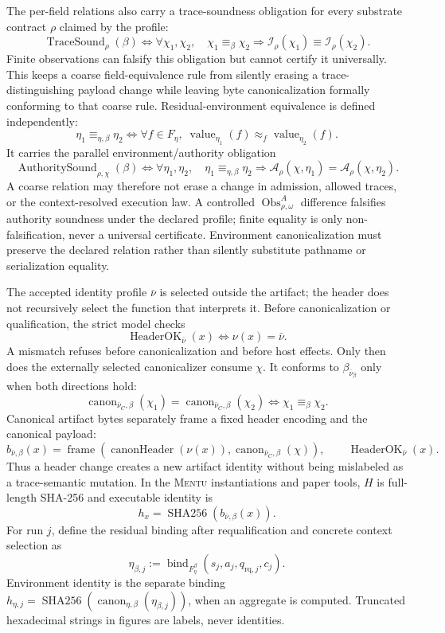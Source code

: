 \documentclass[11pt]{article}
\newcommand{\mentu}{\textsc{Mentu}}
\begin{document}
The per-field relations also carry a trace-soundness obligation for every
substrate contract \(\rho\) claimed by the profile:
\[
\operatorname{TraceSound}_{\rho}(\beta)
\Longleftrightarrow
\forall\chi_1,\chi_2,\quad
\chi_1\equiv_\beta\chi_2
\Rightarrow
\mathcal I_\rho(\chi_1)\equiv\mathcal I_\rho(\chi_2).
\]
Finite observations can falsify this obligation but cannot certify it
universally. This keeps a coarse field-equivalence rule from silently erasing a
trace-distinguishing payload change while leaving byte canonicalization
formally conforming to that coarse rule.
Residual-environment equivalence is defined independently:
\[
\eta_1\equiv_{\eta,\beta}\eta_2
\Longleftrightarrow
\forall f\in F_\eta,\;
\operatorname{value}_{\eta_1}(f)\approx_f
\operatorname{value}_{\eta_2}(f).
\]
It carries the parallel environment/authority obligation
\[
\operatorname{AuthoritySound}_{\rho,\chi}(\beta)
\Longleftrightarrow
\forall\eta_1,\eta_2,\quad
\eta_1\equiv_{\eta,\beta}\eta_2
\Rightarrow
\mathcal A_\rho(\chi,\eta_1)=\mathcal A_\rho(\chi,\eta_2).
\]
A coarse relation may therefore not erase a change in admission, allowed
traces, or the context-resolved execution law. A controlled
\(\operatorname{Obs}^{A}_{\rho,\omega}\) difference falsifies authority
soundness under the declared profile; finite equality is only
non-falsification, never a universal certificate. Environment canonicalization
must preserve the declared relation rather than silently substitute pathname
or serialization equality.

The accepted identity profile \(\bar\nu\) is selected outside the artifact;
the header does not recursively select the function that interprets it.
Before canonicalization or qualification, the strict model checks
\[
\operatorname{HeaderOK}_{\bar\nu}(x)
\Longleftrightarrow \nu(x)=\bar\nu.
\]
A mismatch refuses before canonicalization and before host effects. Only then
does the externally selected canonicalizer consume \(\chi\). It conforms to
\(\beta_{\bar\nu_\beta}\) only when both directions hold:
\[
\operatorname{canon}_{\bar\nu_C,\beta}(\chi_1)
=\operatorname{canon}_{\bar\nu_C,\beta}(\chi_2)
\Longleftrightarrow \chi_1\equiv_\beta\chi_2.
\]
Canonical artifact bytes separately frame a fixed header encoding and the
canonical payload:
\[
b_{\bar\nu,\beta}(x)
=\operatorname{frame}\!\left(
\operatorname{canonHeader}(\nu(x)),
\operatorname{canon}_{\bar\nu_C,\beta}(\chi)
\right),
\qquad \operatorname{HeaderOK}_{\bar\nu}(x).
\]
Thus a header change creates a new artifact identity without being mislabeled
as a trace-semantic mutation. In the \mentu{} instantiations and paper tools,
\(H\) is full-length SHA-256 and executable identity is
\[
  h_x=\operatorname{SHA256}(b_{\bar\nu,\beta}(x)).
\]
For run \(j\), define the residual binding after requalification and concrete
context selection as
\[
\eta_{\beta,j}:=
\operatorname{bind}_{F_\eta^\beta}
(s_j,a_j,q_{\mathrm{rq},j},c_j).
\]
Environment identity is the separate binding
\(h_{\eta,j}=\operatorname{SHA256}(
\operatorname{canon}_{\eta,\beta}(\eta_{\beta,j}))\), when an aggregate is
computed. Truncated hexadecimal strings in figures are labels, never
identities.
\end{document}
